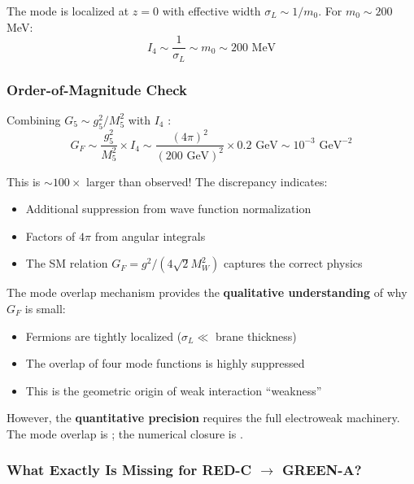 The mode is localized at $z = 0$ with effective width $\sigma_L \sim 1/m_0$.
For $m_0 \sim 200$ MeV:
\begin{equation}
    I_4 \sim \frac{1}{\sigma_L} \sim m_0 \sim 200 \text{ MeV}
    \label{eq:ch11_I4_estimate}
\end{equation}

\subsubsection{Order-of-Magnitude Check}

Combining $G_5 \sim g_5^2/M_5^2$ with $I_4$ \tagP{}:
\begin{equation}
    G_F \sim \frac{g_5^2}{M_5^2} \times I_4
    \sim \frac{(4\pi)^2}{(200 \text{ GeV})^2} \times 0.2 \text{ GeV}
    \sim 10^{-3} \text{ GeV}^{-2}
    \label{eq:ch11_GF_estimate}
\end{equation}

This is $\sim 100\times$ larger than observed! The discrepancy indicates:
\begin{itemize}[nosep]
    \item Additional suppression from wave function normalization
    \item Factors of $4\pi$ from angular integrals
    \item The SM relation $G_F = g^2/(4\sqrt{2}M_W^2)$ captures the correct physics
\end{itemize}

\begin{tcolorbox}[colback=yellow!5, colframe=orange!60!black,
    title=\textbf{Honest Assessment: Mode Overlap Status (YELLOW-B)}]
The mode overlap mechanism provides the \textbf{qualitative understanding}
of why $G_F$ is small:
\begin{itemize}[nosep]
    \item Fermions are tightly localized ($\sigma_L \ll$ brane thickness)
    \item The overlap of four mode functions is highly suppressed
    \item This is the geometric origin of weak interaction ``weakness''
\end{itemize}

However, the \textbf{quantitative precision} requires the full electroweak
machinery. The mode overlap is \tagP{}; the numerical closure is \tagDc{}.
\end{tcolorbox}

\subsubsection{What Exactly Is Missing for RED-C $\to$ GREEN-A?}


